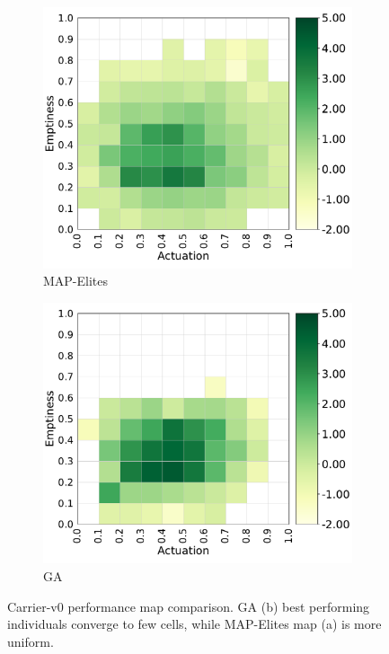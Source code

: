 \begin{figure}[H]
    \centering
    \begin{subfigure}[b]{0.49\textwidth}
         \centering
        \includegraphics[scale=0.45]{images/brain_opt/carrier/carrier_qd_pg}
         \caption{MAP-Elites}
    \end{subfigure}
    \hfill
    \begin{subfigure}[b]{0.49\textwidth}
         \centering
         \includegraphics[scale=0.45]{images/brain_opt/carrier/carrier_ga_pg}
         \caption{GA}
    \end{subfigure}
    \caption{Carrier-v0 performance map comparison. GA (b) best performing individuals converge to few cells, while MAP-Elites map (a) is more uniform.}
    \label{fig:qd_ga_carrier_pg}
\end{figure}

